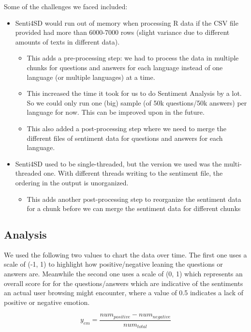 \documentclass[conference]{IEEEtran}
\begin{document}
Some of the challenges we faced included:
\begin{itemize}
    \item Senti4SD would run out of memory when processing R data if the CSV file provided had more than 6000-7000 rows (slight variance due to different amounts of texts in different data).
    \begin{itemize}
        \item This adds a pre-processing step: we had to process the data in multiple chunks for questions and answers for each language instead of one language (or multiple languages) at a time.
        \item This increased the time it took for us to do Sentiment Analysis by a lot. So we could only run one (big) sample (of 50k questions/50k answers) per language for now. This can be improved upon in the future.
        \item This also added a post-processing step where we need to merge the different files of sentiment data for questions and answers for each language.
    \end{itemize}
    \item Senti4SD used to be single-threaded, but the version we used was the multi-threaded one. With different threads writing to the sentiment file, the ordering in the output is unorganized. 
    \begin{itemize}
        \item This adds another post-processing step to reorganize the sentiment data for a chunk before we can merge the sentiment data for different chunks\\
    \end{itemize}
\end{itemize}

\subsection{Analysis}

We used the following two values to chart the data over time. The first one uses a scale of (-1, 1) to highlight how positive/negative leaning the questions or answers are. Meanwhile the second one uses a scale of (0, 1) which represents an overall score for for the questions/answers which are indicative of the sentiments an actual user browsing might encounter, where a value of 0.5 indicates a lack of positive or negative emotion.

\begin{equation}
    y_{em} = \frac{num_{positive} - num_{negative}}{num_{total}}
\end{equation}
\end{document}

